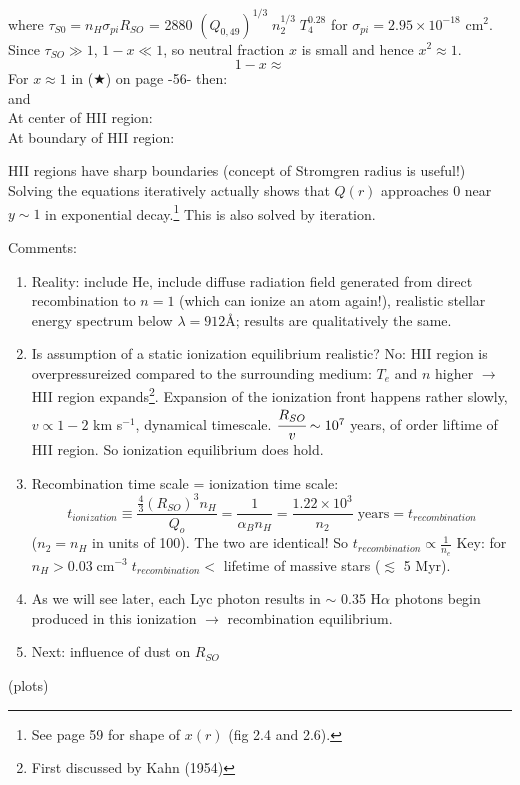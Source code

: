 \documentclass[11pt]{article}
\newcommand{\mar}[1]{\hspace{0pt}\marginpar{-\textcolor{black}{#1}-}}
\begin{document}
where $\tau_{S0} = n_{H}\sigma_{pi}R_{SO}$
= 2880 $(Q_{0,49})^{1/3}\; n_{2}^{1/3}\; T_{4}^{0.28}$
for $\sigma_{pi} = 2.95 \times 10^{-18}$ cm$^{2}$.
Since $\tau_{SO} \gg 1$, $1-x \ll 1$,
so neutral fraction $x$ is small and hence $x^{2} \approx 1$.
\[
    1 - x \approx
    \]
For $x \approx 1$ in (\textcolor{mypur}{$\bigstar$}) on page -56- then:
\[
    \]
and
\[
    \]
At center of HII region:
\[
    \]
At boundary of HII region:
\[
    \]

HII regions have sharp boundaries (concept of Stromgren radius is useful!)
Solving the equations iteratively actually shows that $Q(r)$ approaches 0
near $ y \sim 1 $ in exponential decay.\footnote{
    See page 59 for shape of $x(r)$ (fig 2.4 and 2.6).}
This is also solved by iteration.

\mar{58}Comments:
\begin{enumerate}[itemsep=1ex]
    \item Reality: include He, include diffuse radiation field generated
        from direct recombination to $n=1$ (which can ionize an atom again!),
        realistic stellar energy spectrum below $\lambda = 912$\AA{};
        results are qualitatively the same.
    \item Is assumption of a static ionization equilibrium realistic? No: HII
        region is overpressureized compared to the surrounding medium: $T_{e}$ and
        $n$ higher $\longrightarrow$ HII region expands\footnote{First discussed
        by Kahn (1954)}. Expansion of the ionization front happens rather
        slowly, $v \propto 1-2$ km s$^{-1}$, dynamical timescale.
        $\cfrac{R_{SO}}{v} \sim 10^{7}$ years, of order liftime of HII region.
        So ionization equilibrium does hold.
    \item Recombination time scale = ionization time scale:
        \[
            t_{ionization} \equiv \frac{\frac{4}{3}(R_{SO})^{3}n_{H}}{Q_{o}}
            = \frac{1}{\alpha_{B}n_{H}}
            = \frac{1.22\times10^{3}}{n_{2}}\;\mathrm{years}
            = t_{recombination}
            \]
        ($n_{2} = n_{H}$ in units of 100). The two are identical! So
        $t_{recombination} \propto \frac{1}{n_{e}}$
        Key: for $n_{H} > 0.03\;\mathrm{cm}^{-3}\;t_{recombination} <$
        lifetime of massive stars ($\lesssim$ 5 Myr).
    \item As we will see later, each Lyc photon results in $\sim$ 0.35
        H$\alpha$ photons begin produced in this ionization $\rightarrow$
        recombination equilibrium.
    \item Next: influence of dust on $R_{SO}$
\end{enumerate}
\mar{59}(plots)
\end{document}
